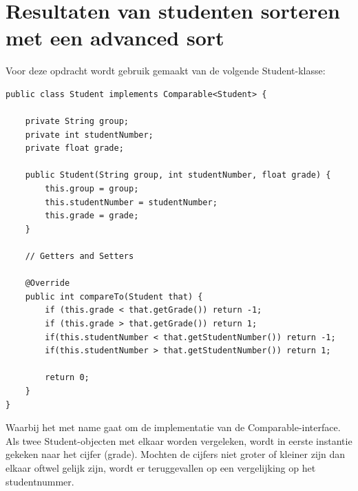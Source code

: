 \documentclass[12pt,notitlepage]{article}
\begin{document}
\renewcommand{\contentsname}{Inhoudsopgave}
\tableofcontents
\clearpage


\section{Resultaten van studenten sorteren met een advanced sort}
Voor deze opdracht wordt gebruik gemaakt van de volgende Student-klasse:

\begin{lstlisting}
public class Student implements Comparable<Student> {

    private String group;
    private int studentNumber;
    private float grade;

    public Student(String group, int studentNumber, float grade) {
        this.group = group;
        this.studentNumber = studentNumber;
        this.grade = grade;
    }
    
    // Getters and Setters
    
    @Override
    public int compareTo(Student that) {
        if (this.grade < that.getGrade()) return -1;
        if (this.grade > that.getGrade()) return 1;
        if(this.studentNumber < that.getStudentNumber()) return -1;
        if(this.studentNumber > that.getStudentNumber()) return 1;

        return 0;
    }
}
\end{lstlisting}

Waarbij het met name gaat om de implementatie van de Comparable-interface. Als twee Student-objecten met elkaar worden vergeleken, wordt in eerste instantie gekeken naar het cijfer (grade). Mochten de cijfers niet groter of kleiner zijn dan elkaar oftwel gelijk zijn, wordt er teruggevallen op een vergelijking op het studentnummer.

\clearpage
\end{document}

